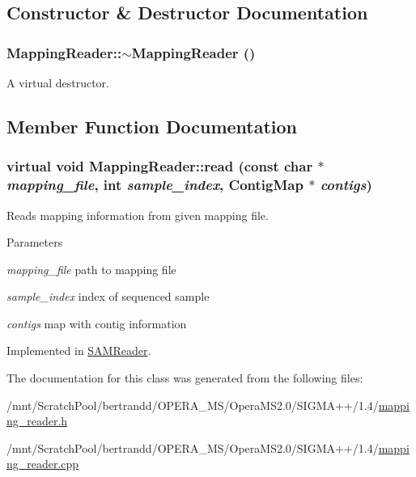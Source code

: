 \subsection{Constructor \& Destructor Documentation}
\hypertarget{classMappingReader_a3bd75c996977d53880f577c4970e25ba}{
\subsubsection[{$\sim$MappingReader}]{\setlength{\rightskip}{0pt plus 5cm}MappingReader::$\sim$MappingReader ()}}
\label{classMappingReader_a3bd75c996977d53880f577c4970e25ba}
A virtual destructor. 

\subsection{Member Function Documentation}
\hypertarget{classMappingReader_ab661f4713f0f686f5476aa796d0d7585}{
\subsubsection[{read}]{\setlength{\rightskip}{0pt plus 5cm}virtual void MappingReader::read (const char $\ast$ {\em mapping\_\-file}, \/  int {\em sample\_\-index}, \/  {\bf ContigMap} $\ast$ {\em contigs})}}
\label{classMappingReader_ab661f4713f0f686f5476aa796d0d7585}


Reads mapping information from given mapping file. 
\begin{DoxyParams}{Parameters}
\item[{\em mapping\_\-file}]path to mapping file \item[{\em sample\_\-index}]index of sequenced sample \item[{\em contigs}]map with contig information \end{DoxyParams}


Implemented in \hyperlink{classSAMReader_a6c11ffaf56aa72aae2d5999cbd21de6f}{SAMReader}.

The documentation for this class was generated from the following files:\begin{DoxyCompactItemize}
\item 
/mnt/ScratchPool/bertrandd/OPERA\_\-MS/OperaMS2.0/SIGMA++/1.4/\hyperlink{mapping__reader_8h}{mapping\_\-reader.h}\item 
/mnt/ScratchPool/bertrandd/OPERA\_\-MS/OperaMS2.0/SIGMA++/1.4/\hyperlink{mapping__reader_8cpp}{mapping\_\-reader.cpp}\end{DoxyCompactItemize}
